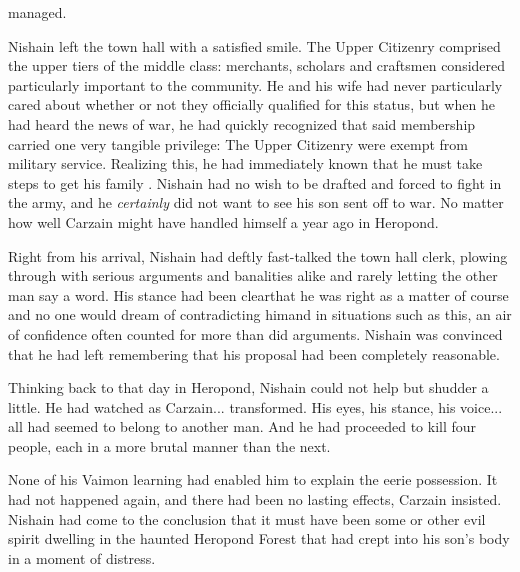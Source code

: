  \Symeon{} managed. 

Nishain left the town hall with a satisfied smile. 
The Upper Citizenry comprised the upper tiers of the middle class: merchants, scholars and craftsmen considered particularly important to the community. 
He and his wife had never particularly cared about whether or not they officially qualified for this status, but when he had heard the news of war, he had quickly recognized that said membership carried one very tangible privilege: 
The Upper Citizenry were exempt from military service. 
Realizing this, he had immediately known that he must take steps to get his family . 
Nishain had no wish to be drafted and forced to fight in the army, and he \emph{certainly} did not want to see his son sent off to war. 
No matter how well Carzain might have handled himself a year ago in Heropond. 

Right from his arrival, Nishain had deftly fast-talked the town hall clerk, plowing through with serious arguments and banalities alike and rarely letting the other man say a word. His stance had been clear\dash{}that he was right as a matter of course and no one would dream of contradicting him\dash{}and in situations such as this, an air of confidence often counted for more than did arguments. Nishain was convinced that he had left \Mr{} \Symeon{} remembering that his proposal had been completely reasonable. 


Thinking back to that day in Heropond, Nishain could not help but shudder a little. 
He had watched as Carzain... transformed. 
His eyes, his stance, his voice... all had seemed to belong to another man. 
And he had proceeded to kill four people, each in a more brutal manner than the next. 

None of his Vaimon learning had enabled him to explain the eerie possession. 
It had not happened again, and there had been no lasting effects, Carzain insisted. 
Nishain had come to the conclusion that it must have been some \qliphah{} or other evil spirit dwelling in the haunted Heropond Forest that had crept into his son's body in a moment of distress. 

